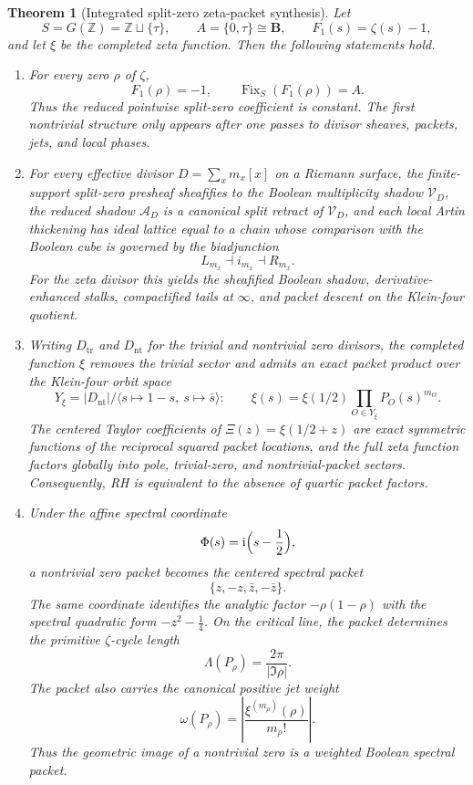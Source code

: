 \documentclass[11pt,a4paper]{article}
\numberwithin{equation}{section}
\newtheorem{theorem}{Theorem}[section]
\theoremstyle{definition}
\theoremstyle{remark}
\DeclareMathOperator{\Fix}{Fix}
\newcommand{\ZZ}{\mathbb Z}
\newcommand{\BB}{\mathbf B}
\newcommand{\cV}{\mathcal V}
\newcommand{\cA}{\mathcal A}
\newcommand{\taup}{\tau}
\newcommand{\ii}{\mathrm i}
\begin{document}
\begin{theorem}[Integrated split-zero zeta-packet synthesis]\label{global:zeta-main}
Let
\[
S=G(\ZZ)=\ZZ\sqcup\{\taup\},
\qquad
A=\{0,\taup\}\cong\BB,
\qquad
F_1(s)=\zeta(s)-1,
\]
and let $\xi$ be the completed zeta function.  Then the following statements hold.

\begin{enumerate}[label=(\arabic*)]
\item For every zero $\rho$ of $\zeta$,
\[
F_1(\rho)=-1,
\qquad
\Fix_S(F_1(\rho))=A.
\]
Thus the reduced pointwise split-zero coefficient is constant.  The first nontrivial structure only appears after one passes to divisor sheaves, packets, jets, and local phases.

\item For every effective divisor $D=\sum_x m_x[x]$ on a Riemann surface, the finite-support split-zero presheaf sheafifies to the Boolean multiplicity shadow $\cV_D$, the reduced shadow $\cA_D$ is a canonical split retract of $\cV_D$, and each local Artin thickening has ideal lattice equal to a chain whose comparison with the Boolean cube is governed by the biadjunction
\[
L_{m_x}\dashv i_{m_x}\dashv R_{m_x}.
\]
For the zeta divisor this yields the sheafified Boolean shadow, derivative-enhanced stalks, compactified tails at $\infty$, and packet descent on the Klein-four quotient.

\item Writing $D_{\mathrm{tr}}$ and $D_{\mathrm{nt}}$ for the trivial and nontrivial zero divisors, the completed function $\xi$ removes the trivial sector and admits an exact packet product over the Klein-four orbit space
\[
Y_\xi=|D_{\mathrm{nt}}|/\langle s\mapsto 1-s,\ s\mapsto \bar s\rangle:
\qquad
\xi(s)=\xi(1/2)\prod_{O\in Y_\xi} P_O(s)^{m_O}.
\]
The centered Taylor coefficients of $\Xi(z)=\xi(1/2+z)$ are exact symmetric functions of the reciprocal squared packet locations, and the full zeta function factors globally into pole, trivial-zero, and nontrivial-packet sectors.  Consequently, RH is equivalent to the absence of quartic packet factors.

\item Under the affine spectral coordinate
\[
\Phi(s)=\ii\Bigl(s-\frac12\Bigr),
\]
a nontrivial zero packet becomes the centered spectral packet
\[
\{z,-z,\bar z,-\bar z\}.
\]
The same coordinate identifies the analytic factor $-\rho(1-\rho)$ with the spectral quadratic form $-z^2-\frac14$.  On the critical line, the packet determines the primitive $\zeta$-cycle length
\[
\Lambda(P_\rho)=\frac{2\pi}{|\Im\rho|}.
\]
The packet also carries the canonical positive jet weight
\[
\omega(P_\rho)=\left|\frac{\xi^{(m_\rho)}(\rho)}{m_\rho!}\right|.
\]
Thus the geometric image of a nontrivial zero is a weighted Boolean spectral packet.


\end{enumerate}
\end{theorem}
\end{document}
